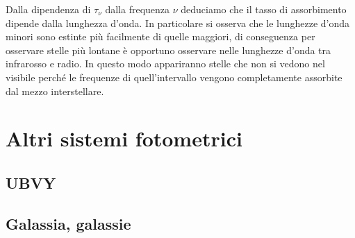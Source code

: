         Dalla dipendenza di $\tau_\nu$ dalla frequenza $\nu$ deduciamo che il tasso di assorbimento dipende dalla lunghezza d'onda. In particolare si osserva che le lunghezze d'onda minori sono estinte più facilmente di quelle maggiori, di conseguenza per osservare stelle più lontane è opportuno osservare nelle lunghezze d'onda tra infrarosso e radio. In questo modo appariranno stelle che non si vedono nel visibile perché le frequenze di quell'intervallo vengono completamente assorbite dal mezzo interstellare.
\section{Altri sistemi fotometrici}
    \subsection{UBVY}
    \subsection{Galassia, galassie}